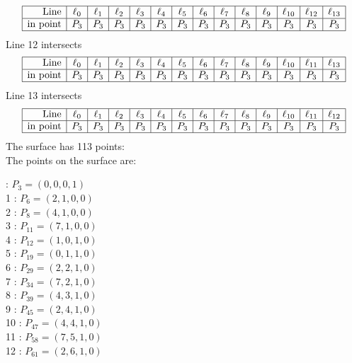 \documentclass{article}
\begin{document}
{$$\begin{array}{|r*{13}{|c}|}
\hline
\mbox{Line}  & \ell_{0} & \ell_{1} & \ell_{2} & \ell_{3} & \ell_{4} & \ell_{5} & \ell_{6} & \ell_{7} & \ell_{8} & \ell_{9} & \ell_{10} & \ell_{12} & \ell_{13}\\
\hline
\mbox{in point}  & P_{3} & P_{3} & P_{3} & P_{3} & P_{3} & P_{3} & P_{3} & P_{3} & P_{3} & P_{3} & P_{3} & P_{3} & P_{3}\\
\hline
\end{array}
$$
Line 12 intersects 
$$
\begin{array}{|r*{13}{|c}|}
\hline
\mbox{Line}  & \ell_{0} & \ell_{1} & \ell_{2} & \ell_{3} & \ell_{4} & \ell_{5} & \ell_{6} & \ell_{7} & \ell_{8} & \ell_{9} & \ell_{10} & \ell_{11} & \ell_{13}\\
\hline
\mbox{in point}  & P_{3} & P_{3} & P_{3} & P_{3} & P_{3} & P_{3} & P_{3} & P_{3} & P_{3} & P_{3} & P_{3} & P_{3} & P_{3}\\
\hline
\end{array}
$$
Line 13 intersects 
$$
\begin{array}{|r*{13}{|c}|}
\hline
\mbox{Line}  & \ell_{0} & \ell_{1} & \ell_{2} & \ell_{3} & \ell_{4} & \ell_{5} & \ell_{6} & \ell_{7} & \ell_{8} & \ell_{9} & \ell_{10} & \ell_{11} & \ell_{12}\\
\hline
\mbox{in point}  & P_{3} & P_{3} & P_{3} & P_{3} & P_{3} & P_{3} & P_{3} & P_{3} & P_{3} & P_{3} & P_{3} & P_{3} & P_{3}\\
\hline
\end{array}
$$
The surface has 113 points:\\
The points on the surface are:\\
\begin{multicols}{3}
 : $P_{3}=( 0, 0, 0, 1 )$\\
1 : $P_{6}=( 2, 1, 0, 0 )$\\
2 : $P_{8}=( 4, 1, 0, 0 )$\\
3 : $P_{11}=( 7, 1, 0, 0 )$\\
4 : $P_{12}=( 1, 0, 1, 0 )$\\
5 : $P_{19}=( 0, 1, 1, 0 )$\\
6 : $P_{29}=( 2, 2, 1, 0 )$\\
7 : $P_{34}=( 7, 2, 1, 0 )$\\
8 : $P_{39}=( 4, 3, 1, 0 )$\\
9 : $P_{45}=( 2, 4, 1, 0 )$\\
10 : $P_{47}=( 4, 4, 1, 0 )$\\
11 : $P_{58}=( 7, 5, 1, 0 )$\\
12 : $P_{61}=( 2, 6, 1, 0 )$\\

\end{multicols}}
\end{document}
